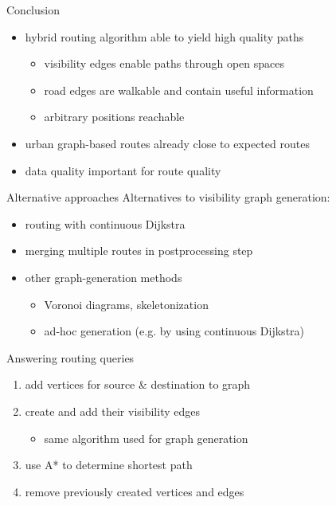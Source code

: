 \documentclass[xcolor={x11names}]{beamer}
\renewcommand{\n}{\hfill\\[0.5ex]}
\newcommand{\startBackupSlides}
{
	\appendix
	\renewcommand*\insertshorttitle
	{
		\makebox[0.94\textwidth]{\oldmacro\hfill Appendix -- (\insertframenumber)\,/\,\inserttotalframenumber}
	}
}
\begin{document}
		\begin{frame}{Conclusion}
			\begin{itemize}
				\item hybrid routing algorithm able to yield high quality paths
				\begin{itemize}
					\item visibility edges enable paths through open spaces
					\item road edges are walkable and contain useful information
					\item arbitrary positions reachable
				\end{itemize}
				\item urban graph-based routes already close to expected routes
				\item data quality important for route quality
			\end{itemize}
		\end{frame}		
	
	\startBackupSlides
	
	\begin{frame}{Alternative approaches}
		Alternatives to visibility graph generation:\n
		\begin{itemize}
			\item routing with continuous Dijkstra
			\item merging multiple routes in postprocessing step
			\item other graph-generation methods
			\begin{itemize}
				\item Voronoi diagrams, skeletonization
				\item ad-hoc generation (e.g. by using continuous Dijkstra)
			\end{itemize}
		\end{itemize}
	\end{frame}
	
	\begin{frame}{Answering routing queries}
		\begin{enumerate}
			\item add vertices for source \& destination to graph
			\item create and add their visibility edges
			\begin{itemize}
				\item[\textrightarrow] same algorithm used for graph generation
			\end{itemize}
			\item use A* to determine shortest path
			\item remove previously created vertices and edges
		\end{enumerate}
	\end{frame}
	
\end{document}

